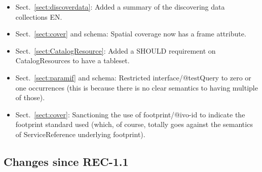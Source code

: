 \documentclass[11pt,a4paper]{ivoa}
\begin{document}
\begin{itemize}
\item Sect.~\ref{sect:discoverdata}:
Added a summary of the discovering data collections EN.
\item Sect.~\ref{sect:cover} and schema:
Spatial coverage now has a frame attribute.
\item Sect.~\ref{sect:CatalogResource}:
Added a SHOULD requirement on CatalogResources to
have a tableset.
\item Sect.~\ref{sect:paramif} and schema:
Restricted interface/@testQuery to zero or one occurrences (this
is because there is no clear semantics to having multiple of those).
\item Sect.~\ref{sect:cover}:
Sanctioning the use of footprint/@ivo-id to indicate the footprint
standard used (which, of course, totally goes against the semantics of
ServiceReference underlying footprint).
\end{itemize}

\subsection{Changes since REC-1.1}
\end{document}
